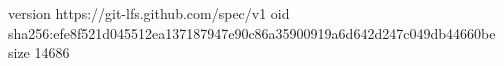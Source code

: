 version https://git-lfs.github.com/spec/v1
oid sha256:efe8f521d045512ea137187947e90c86a35900919a6d642d247c049db44660be
size 14686
